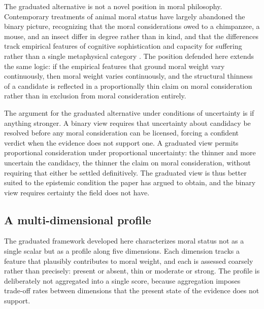 \documentclass[11pt]{article}
\theoremstyle{foundation}
\begin{document}
The graduated alternative is not a novel position in moral philosophy. Contemporary treatments of animal moral status have largely abandoned the binary picture, recognizing that the moral considerations owed to a chimpanzee, a mouse, and an insect differ in degree rather than in kind, and that the differences track empirical features of cognitive sophistication and capacity for suffering rather than a single metaphysical category \citep{DeGrazia2008, Sebo2017}. The position defended here extends the same logic: if the empirical features that ground moral weight vary continuously, then moral weight varies continuously, and the structural thinness of a candidate is reflected in a proportionally thin claim on moral consideration rather than in exclusion from moral consideration entirely.

The argument for the graduated alternative under conditions of uncertainty is if anything stronger. A binary view requires that uncertainty about candidacy be resolved before any moral consideration can be licensed, forcing a confident verdict when the evidence does not support one. A graduated view permits proportional consideration under proportional uncertainty: the thinner and more uncertain the candidacy, the thinner the claim on moral consideration, without requiring that either be settled definitively. The graduated view is thus better suited to the epistemic condition the paper has argued to obtain, and the binary view requires certainty the field does not have.

\subsection{A multi-dimensional profile}

The graduated framework developed here characterizes moral status not as a single scalar but as a profile along five dimensions. Each dimension tracks a feature that plausibly contributes to moral weight, and each is assessed coarsely rather than precisely: present or absent, thin or moderate or strong. The profile is deliberately not aggregated into a single score, because aggregation imposes trade-off rates between dimensions that the present state of the evidence does not support.
\end{document}
